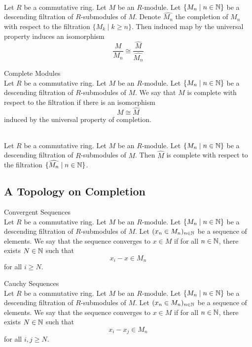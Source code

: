 \documentclass[a4paper]{article}
\begin{document}
\begin{prp}{}{}\\
Let $R$ be a commutative ring. Let $M$ be an $R$-module. Let $\{M_n\;|\;n\in\mathbb{N}\}$ be a descending filtration of $R$-submodules of $M$. Denote $\widehat{M_n}$ the completion of $M_n$ with respect to the filtration $\{M_k\;|\;k\geq n\}$. Then induced map by the universal property induces an isomorphism $$\frac{M}{M_n}\cong\frac{\widehat{M}}{\widehat{M_n}}$$
\end{prp}

\begin{defn}{Complete Modules}{}\\
Let $R$ be a commutative ring. Let $M$ be an $R$-module. Let $\{M_n\;|\;n\in\mathbb{N}\}$ be a descending filtration of $R$-submodules of $M$. We say that $M$ is complete with respect to the filtration if there is an isomorphism $$M\cong\widehat{M}$$ induced by the universal property of completion. 
\end{defn}

\begin{prp}{}{}\\
Let $R$ be a commutative ring. Let $M$ be an $R$-module. Let $\{M_n\;|\;n\in\mathbb{N}\}$ be a descending filtration of $R$-submodules of $M$. Then $\widehat{M}$ is complete with respect to the filtration $\{\widehat{M_n}\;|\;n\in\mathbb{N}\}$. 
\end{prp}

\subsection{A Topology on Completion}
\begin{defn}{Convergent Sequences}{}\\
Let $R$ be a commutative ring. Let $M$ be an $R$-module. Let $\{M_n\;|\;n\in\mathbb{N}\}$ be a descending filtration of $R$-submodules of $M$. Let $(x_n\in M_n)_{n\in\mathbb{N}}$ be a sequence of elements. We say that the sequence converges to $x\in M$ if for all $n\in\mathbb{N}$, there exists $N\in\mathbb{N}$ such that $$x_i-x\in M_n$$ for all $i\geq N$. 
\end{defn}

\begin{defn}{Cauchy Sequences}{}\\
Let $R$ be a commutative ring. Let $M$ be an $R$-module. Let $\{M_n\;|\;n\in\mathbb{N}\}$ be a descending filtration of $R$-submodules of $M$. Let $(x_n\in M_n)_{n\in\mathbb{N}}$ be a sequence of elements. We say that the sequence converges to $x\in M$ if for all $n\in\mathbb{N}$, there exists $N\in\mathbb{N}$ such that $$x_i-x_j\in M_n$$ for all $i,j\geq N$. 
\end{defn}
\end{document}

